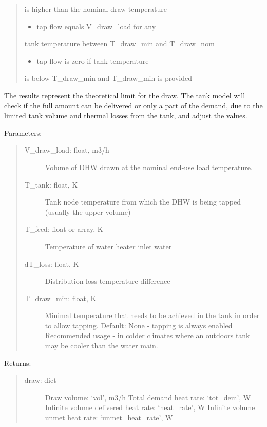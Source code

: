\documentclass[letterpaper,10pt,english,openany]{sphinxmanual}
\begin{document}
\begin{fulllineitems}
\begin{fulllineitems}
\begin{quote}
\begin{itemize}
\end{itemize}

is higher than the nominal draw temperature
\begin{itemize}
\item {} 
tap flow equals V\_draw\_load for any

\end{itemize}

tank temperature between T\_draw\_min
and T\_draw\_nom
\begin{itemize}
\item {} 
tap flow is zero if tank temperature

\end{itemize}

is below T\_draw\_min and T\_draw\_min is
provided
\end{quote}

The results represent the theoretical limit
for the draw. The tank model will check if the
full amount can be delivered or only a
part of the demand, due to the limited
tank volume and thermal losses from the tank,
and adjust the values.

Parameters:
\begin{quote}
\begin{description}
\item[{V\_draw\_load: float, m3/h}] \leavevmode
Volume of DHW drawn at the nominal
end-use load temperature.

\item[{T\_tank: float, K}] \leavevmode
Tank node temperature from which the
DHW is being tapped (usually the
upper volume)

\item[{T\_feed: float or array, K}] \leavevmode
Temperature of water heater inlet water

\item[{dT\_loss: float, K}] \leavevmode
Distribution loss temperature difference

\item[{T\_draw\_min: float, K}] \leavevmode
Minimal temperature that needs to
be achieved in the tank in order
to allow tapping.
Default: None - tapping is always
enabled
Recommended usage - in colder climates
where an outdoors tank may be cooler
than the water main.

\end{description}
\end{quote}

Returns:
\begin{quote}
\begin{description}
\item[{draw: dict}] \leavevmode
Draw volume: ‘vol’, m3/h
Total demand heat rate: ‘tot\_dem’, W
Infinite volume delivered heat rate: ‘heat\_rate’, W
Infinite volume unmet heat rate: ‘unmet\_heat\_rate’, W


\end{description}
\end{quote}
\end{fulllineitems}
\end{fulllineitems}
\end{document}
